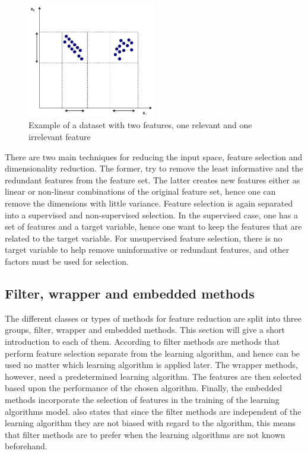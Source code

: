     \begin{figure}
        \centering
        \includegraphics[width=0.5\textwidth]{report/figures/techniques/feature_selection.pdf}
        \caption{Example of a dataset with two features, one relevant and one irrelevant feature}
        \label{fig:feature_selection}
    \end{figure}
    
    There are two main techniques for reducing the input space, feature selection and dimensionality reduction. The former, try to remove the least informative and the redundant features from the feature set. The latter creates new features either as linear or non-linear combinations of the original feature set, hence one can remove the dimensions with little variance. Feature selection is again separated into a supervised and non-supervised selection. In the supervised case, one has a set of features and a target variable, hence one want to keep the features that are related to the target variable. For unsupervised feature selection, there is no target variable to help remove uninformative or redundant features, and other factors must be used for selection.
    
    
    \subsection{Filter, wrapper and embedded methods}\label{subsec:filter_wrapper_embedded}
        The different classes or types of methods for feature reduction are split into three groups, filter, wrapper and embedded methods. This section will give a short introduction to each of them.
        According to \cite{Liu2010} filter methods are methods that perform feature selection separate from the learning algorithm, and hence can be used no matter which learning algorithm is applied later. The wrapper methods, however, need a predetermined learning algorithm. The features are then selected based upon the performance of the chosen algorithm.  Finally, the embedded methods incorporate the selection of features in the training of the learning algorithms model. \cite{Liu2010} also states that since the filter methods are independent of the learning algorithm they are not biased with regard to the algorithm, this means that filter methods are to prefer when the learning algorithms are not known beforehand. 
